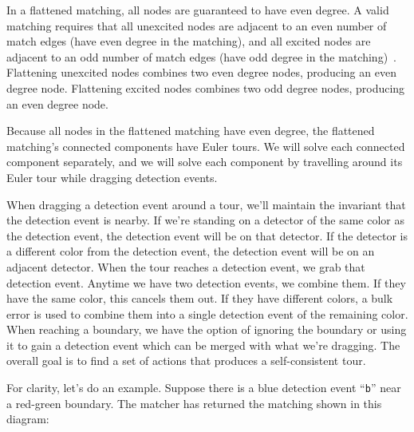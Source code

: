 \documentclass[onecolumn,unpublished,a4paper]{quantumarticle}
\theoremstyle{definition}
\theoremstyle{definition}
\theoremstyle{definition}
\begin{document}
In a flattened matching, all nodes are guaranteed to have even degree.
A valid matching requires that all unexcited nodes are adjacent to an even number of match edges (have even degree in the matching), and all excited nodes are adjacent to an odd number of match edges (have odd degree in the matching)~\cite{higgott2023sparseblossom}.
Flattening unexcited nodes combines two even degree nodes, producing an even degree node.
Flattening excited nodes combines two odd degree nodes, producing an even degree node.

Because all nodes in the flattened matching have even degree, the flattened matching's connected components have Euler tours.
We will solve each connected component separately, and we will solve each component by travelling around its Euler tour while dragging detection events.

When dragging a detection event around a tour, we'll maintain the invariant that the detection event is nearby.
If we're standing on a detector of the same color as the detection event, the detection event will be on that detector.
If the detector is a different color from the detection event, the detection event will be on an adjacent detector.
When the tour reaches a detection event, we grab that detection event.
Anytime we have two detection events, we combine them.
If they have the same color, this cancels them out.
If they have different colors, a bulk error is used to combine them into a single detection event of the remaining color.
When reaching a boundary, we have the option of ignoring the boundary or using it to gain a detection event which can be merged with what we're dragging.
The overall goal is to find a set of actions that produces a self-consistent tour.

For clarity, let's do an example.
Suppose there is a blue detection event ``\texttt{b}'' near a red-green boundary.
The matcher has returned the matching shown in this diagram:

\begin{center}
\end{center}
\end{document}
